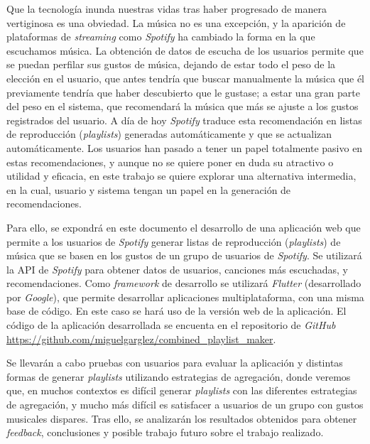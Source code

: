 Que la tecnología inunda nuestras vidas tras haber progresado de manera vertiginosa es una obviedad.
La música no es una excepción, y la aparición de plataformas de \textit{streaming} como \textit{Spotify} ha cambiado la forma en la que escuchamos música.
La obtención de datos de escucha de los usuarios permite que se puedan perfilar sus gustos de música, dejando de estar todo el peso 
de la elección en el usuario, que antes tendría que buscar manualmente la música que él previamente tendría 
que haber descubierto que le gustase; a estar una gran parte del peso en el sistema, que recomendará la música 
que más se ajuste a los gustos registrados del usuario. A día de hoy \textit{Spotify} traduce esta recomendación en listas de reproducción (\textit{playlists})
generadas automáticamente y que se actualizan automáticamente. Los usuarios han pasado a tener un papel totalmente pasivo en estas recomendaciones, y
aunque no se quiere poner en duda su atractivo o utilidad y eficacia, en este trabajo se quiere explorar una alternativa intermedia, en la cual, usuario y sistema
tengan un papel en la generación de recomendaciones.

Para ello, se expondrá en este documento el desarrollo de una aplicación web que permite a los usuarios de \textit{Spotify}
generar listas de reproducción (\textit{playlists}) de música que se basen en los gustos de un grupo de usuarios de \textit{Spotify}. Se utilizará la API de \textit{Spotify}
para obtener datos de usuarios, canciones más escuchadas, y recomendaciones. Como \textit{framework} de desarrollo se utilizará \textit{Flutter} (desarrollado por \textit{Google}), que permite desarrollar aplicaciones
multiplataforma, con una misma base de código. En este caso se hará uso de la versión web de la aplicación. El código de la aplicación desarrollada se encuenta en el repositorio de \textit{GitHub} 
\url{https://github.com/miguelgarglez/combined_playlist_maker}.

Se llevarán a cabo pruebas con usuarios para evaluar la aplicación y distintas formas de generar \textit{playlists} utilizando estrategias de agregación, donde veremos que, en muchos contextos 
es difícil generar \textit{playlists} con las diferentes estrategias de agregación, y mucho más difícil es satisfacer a usuarios de un grupo con gustos musicales dispares.
Tras ello, se analizarán los resultados obtenidos para obtener \textit{feedback}, conclusiones y posible trabajo futuro sobre el trabajo realizado. 

